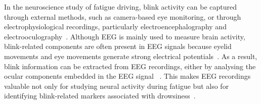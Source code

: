 In the neuroscience study of fatigue driving, blink activity can be captured through external methods, such as camera-based eye monitoring, or through electrophysiological recordings, particularly electroencephalography and electrooculography~\citep{tian2021fatigue,shahbakhti2023fusion}. Although EEG is mainly used to measure brain activity, blink-related components are often present in EEG signals because eyelid movements and eye movements generate strong electrical potentials~\citep{croft2000removal,akuthota2023artifacts}.
As a result, blink information can be extracted from EEG recordings, either by analysing the ocular components embedded in the EEG signal ~\citep{agarwal2019blink,shahbakhti2023fusion}.
This makes EEG recordings valuable not only for studying neural activity during fatigue but also for identifying blink-related markers associated with drowsiness~\citep{ko2020eyeblink,alyan2023blink}.

